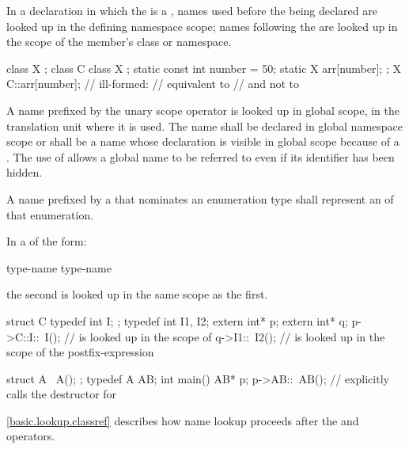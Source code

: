 \pnum
In a declaration in which the  is a
, names used before the 
being declared are looked up in the defining namespace scope; names
following the  are looked up in the scope of the
member's class or namespace. \begin{example}

\begin{codeblock}
class X { };
class C {
  class X { };
  static const int number = 50;
  static X arr[number];
};
X C::arr[number];   // ill-formed:
                    // equivalent to  
                    // and not to  
\end{codeblock}
\end{example}

\pnum
{}%
%
A name prefixed by the unary scope operator \tcode{::}
is looked up in global scope, in the translation unit where it is used.
The name shall be declared in global namespace scope or shall be a name
whose declaration is visible in global scope because of a
. The use of \tcode{::}
allows a global name to be referred to even if its identifier has been
hidden.

\pnum
A name prefixed by a  that
nominates an enumeration type shall represent an 
of that enumeration.

\pnum
In a  of the form:

\begin{ncbnf}
 type-name \terminal{::} \terminal{\~} type-name
\end{ncbnf}
the second  is looked up in the same scope as the first.
\begin{example}
\begin{codeblock}
struct C {
  typedef int I;
};
typedef int I1, I2;
extern int* p;
extern int* q;
p->C::I::~I();      //  is looked up in the scope of 
q->I1::~I2();       //  is looked up in the scope of the postfix-expression

struct A {
  ~A();
};
typedef A AB;
int main() {
  AB* p;
  p->AB::~AB();     // explicitly calls the destructor for 
}
\end{codeblock}
\end{example}
\begin{note} \ref{basic.lookup.classref} describes how name
lookup proceeds after the  and \tcode{->} operators.
\end{note}

